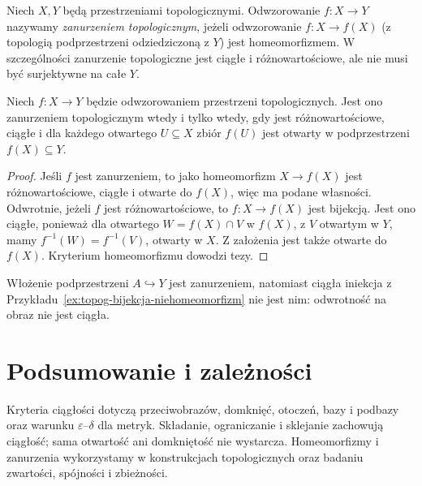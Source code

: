 \begin{definicja}
\label{def:topog-zanurzenie-topologiczne}
Niech $X,Y$ będą przestrzeniami topologicznymi.
Odwzorowanie $f\colon X\to Y$ nazywamy
\emph{zanurzeniem topologicznym}, jeżeli odwzorowanie
$f\colon X\to f(X)$ (z topologią podprzestrzeni
odziedziczoną z $Y$) jest homeomorfizmem.
W szczególności zanurzenie topologiczne jest ciągłe
i różnowartościowe, ale nie musi być surjektywne
na całe $Y$.
\end{definicja}

\begin{stwierdzenie}
\label{prop:topog-zanurzenie-kryterium}
Niech $f\colon X\to Y$ będzie odwzorowaniem
przestrzeni topologicznych. Jest ono zanurzeniem
topologicznym wtedy i tylko wtedy, gdy jest różnowartościowe,
ciągłe i dla każdego otwartego $U\subseteq X$ zbiór
$f(U)$ jest otwarty w podprzestrzeni $f(X)\subseteq Y$.
\end{stwierdzenie}
\begin{proof}
Jeśli $f$ jest zanurzeniem, to jako homeomorfizm
$X\to f(X)$ jest różnowartościowe, ciągłe i otwarte
do $f(X)$, więc ma podane własności.
Odwrotnie, jeżeli $f$ jest różnowartościowe,
to $f\colon X\to f(X)$ jest bijekcją.
Jest ono ciągłe, ponieważ dla otwartego
$W=f(X)\cap V$ w $f(X)$, z $V$ otwartym w $Y$,
mamy $f^{-1}(W)=f^{-1}(V)$, otwarty w $X$.
Z założenia jest także otwarte do $f(X)$.
Kryterium homeomorfizmu dowodzi tezy.
\end{proof}

\enlargethispage{1\baselineskip}
\begin{przyklad}
\label{ex:topog-zanurzenie-przyklady}
Włożenie podprzestrzeni $A\hookrightarrow Y$ jest zanurzeniem,
natomiast ciągła iniekcja z
Przykładu~\ref{ex:topog-bijekcja-niehomeomorfizm}
nie jest nim: odwrotność na obraz nie jest ciągła.
\end{przyklad}

\section{Podsumowanie i zależności}
\label{sec:topog-ciaglosc-podsumowanie}

Kryteria ciągłości dotyczą przeciwobrazów,
domknięć, otoczeń, bazy i podbazy oraz
warunku $\varepsilon$--$\delta$ dla metryk.
Składanie, ograniczanie i sklejanie zachowują ciągłość;
sama otwartość ani domkniętość nie wystarcza.
Homeomorfizmy i zanurzenia wykorzystamy
w konstrukcjach topologicznych oraz badaniu
zwartości, spójności i zbieżności.
